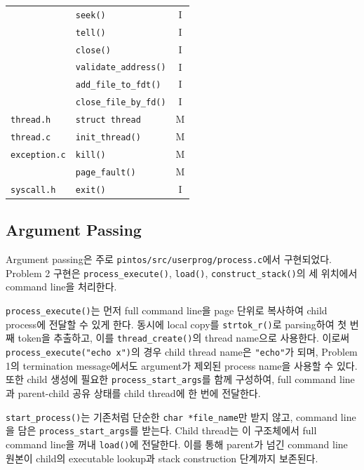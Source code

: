 \documentclass[conference]{IEEEtran}
\newcommand{\codefont}[1]{\texttt{\color{darkmagenta}#1}}
\begin{document}
\begin{table}[htbp]
\begin{tabular}{llc}
        & \codefont{seek()} & I \\
        & \codefont{tell()} & I \\
        & \codefont{close()} & I \\
        & \codefont{validate\_address()} & I \\
        & \codefont{add\_file\_to\_fdt()} & I \\
        & \codefont{close\_file\_by\_fd()} & I \\
        \midrule
        \texttt{thread.h} & \codefont{struct thread} & M \\
        \midrule
        \texttt{thread.c} & \codefont{init\_thread()} & M \\
        \midrule
        \texttt{exception.c} & \codefont{kill()} & M \\
        & \codefont{page\_fault()} & M \\
        \midrule
        \texttt{syscall.h} & \codefont{exit()} & I \\
        \bottomrule
    \end{tabular}
\end{table}

\subsection{Argument Passing}

Argument passing은 주로 \codefont{pintos/src/userprog/process.c}에서 구현되었다. Problem 2 구현은 \codefont{process\_execute()}, \codefont{load()}, \codefont{construct\_stack()}의 세 위치에서 command line을 처리한다.

\codefont{process\_execute()}는 먼저 full command line을 page 단위로 복사하여 child process에 전달할 수 있게 한다. 동시에 local copy를 \codefont{strtok\_r()}로 parsing하여 첫 번째 token을 추출하고, 이를 \codefont{thread\_create()}의 thread name으로 사용한다. 이로써 \codefont{process\_execute("echo x")}의 경우 child thread name은 \codefont{"echo"}가 되며, Problem 1의 termination message에서도 argument가 제외된 process name을 사용할 수 있다. 또한 child 생성에 필요한 \codefont{process\_start\_args}를 함께 구성하여, full command line과 parent-child 공유 상태를 child thread에 한 번에 전달한다.

\codefont{start\_process()}는 기존처럼 단순한 \codefont{char *file\_name}만 받지 않고, command line을 담은 \codefont{process\_start\_args}를 받는다. Child thread는 이 구조체에서 full command line을 꺼내 \codefont{load()}에 전달한다. 이를 통해 parent가 넘긴 command line 원본이 child의 executable lookup과 stack construction 단계까지 보존된다.
\end{document}
